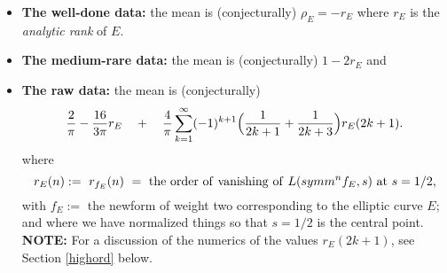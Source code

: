 \documentclass[11pt]{article}
\theoremstyle{plain}
\theoremstyle{definition}
\newtheorem{project}[theorem]{Project}
\numberwithin{equation}{section}
\numberwithin{figure}{section}
\numberwithin{table}{section}
\begin{document}
    \begin{itemize}
   \item {\bf The well-done data:} the  mean is (conjecturally) $\rho_E= -r_E$ where $r_E$ is the {\it analytic rank} of $E$.
    \item {\bf The medium-rare data:} the  mean is  (conjecturally)  $1-2r_E$ and
      \item {\bf The raw data:} the  mean is  (conjecturally) \begin{equation*}
{\frac{2}{\pi}}- {\frac{16}{3\pi}}r_E \ \ \ + \ \ \  {\frac{4}{\pi}} \sum_{k=1}^{\infty}  (-1)^{k+1}\Bigl({\frac{1}{2k+1}} + {\frac{1}{2k+3}}\Bigr) r_E({2k+1}).
\end{equation*} where $$r_E(n):= \ r_{f_E}(n)\ = \ {\rm the\ order\ of\ vanishing\ of\ }L(symm^nf_E, s)\ {\rm at}\ s=1/2,$$ with $f_E:=$ the newform of weight two corresponding to the elliptic curve $E$; and where we have normalized things so that $s=1/2$ is the central point. {\bf NOTE:} For a discussion of the numerics of the values $r_E({2k+1})$, see Section {\ref{highord}} below.
   \end{itemize}


\end{document}
